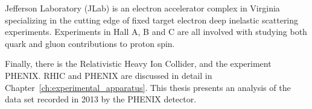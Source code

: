 Jefferson Laboratory (JLab) is an electron accelerator complex in Virginia
specializing in the cutting edge of fixed target electron deep inelastic
scattering experiments. Experiments in Hall A, B and C are all involved with
studying both quark and gluon contributions to proton spin.

Finally, there is the Relativistic Heavy Ion Collider, and the experiment
PHENIX. RHIC and PHENIX are discussed in detail in
Chapter~\ref{ch:experimental_apparatus}. This thesis presents an analysis of the
data set recorded in 2013 by the PHENIX detector.
